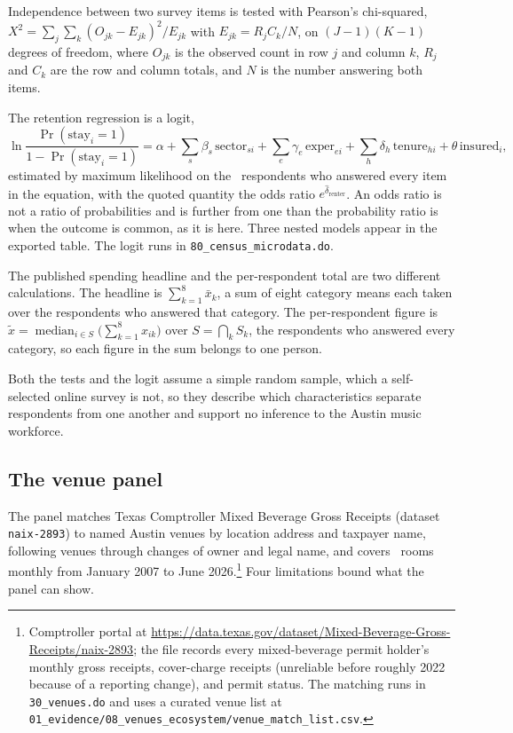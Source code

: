 Independence between two survey items is tested with Pearson's chi-squared,
\(X^{2} = \sum_j \sum_k (O_{jk}-E_{jk})^{2}/E_{jk}\) with
\(E_{jk} = R_j C_k/N\), on \((J-1)(K-1)\) degrees of freedom, where
\(O_{jk}\) is the observed count in row \(j\) and column \(k\), \(R_j\) and
\(C_k\) are the row and column totals, and \(N\) is the number answering
both items.

The retention regression is a logit,
\[
\ln\frac{\Pr(\mathrm{stay}_i = 1)}{1-\Pr(\mathrm{stay}_i = 1)}
  = \alpha + \sum_s \beta_s\,\mathrm{sector}_{si}
  + \sum_e \gamma_e\,\mathrm{exper}_{ei}
  + \sum_h \delta_h\,\mathrm{tenure}_{hi}
  + \theta\,\mathrm{insured}_i ,
\]
estimated by maximum likelihood on the \NCensusLogitN\ respondents who
answered every item in the equation, with the quoted quantity the odds
ratio \(e^{\hat\delta_{\mathrm{renter}}}\). An odds ratio is not a ratio of
probabilities and is further from one than the probability ratio is
when the outcome is common, as it is here. Three nested models appear in
the exported table. The logit runs in \texttt{80\_census\_microdata.do}.

The published spending headline and the per-respondent total are two
different calculations. The headline is \(\sum_{k=1}^{8}\bar{x}_k\), a sum
of eight category means each taken over the respondents who answered that
category. The per-respondent figure is
\(\tilde{x} = \operatorname{median}_{i \in S}\bigl(\sum_{k=1}^{8}x_{ik}\bigr)\)
over \(S = \bigcap_k S_k\), the respondents who answered every category,
so each figure in the sum belongs to one person.

Both the tests and the logit assume a simple random sample, which a
self-selected online survey is not, so they describe which characteristics
separate respondents from one another and support no inference to the
Austin music workforce.

\subsection{The venue panel}

The panel matches Texas Comptroller Mixed Beverage Gross Receipts (dataset
\texttt{naix-2893}) to named Austin venues by location address and taxpayer
name, following venues through changes of owner and legal name, and covers
\NVenuePanelIsCurated\ rooms monthly from January 2007 to June
2026.\footnote{Comptroller portal at
\url{https://data.texas.gov/dataset/Mixed-Beverage-Gross-Receipts/naix-2893};
the file records every mixed-beverage permit holder's monthly gross
receipts, cover-charge receipts (unreliable before roughly 2022 because of
a reporting change), and permit status. The matching runs in
\texttt{30\_venues.do} and uses a curated venue list at
\texttt{01\_evidence/08\_venues\_ecosystem/venue\_match\_list.csv}.} Four
limitations bound what the panel can show.

